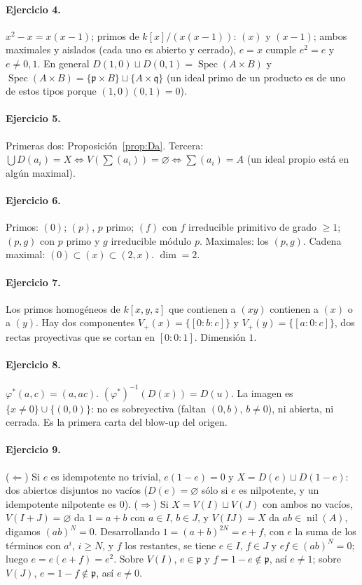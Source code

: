 \documentclass[11pt,a4paper]{article}
\newcommand{\Spec}{\operatorname{Spec}}
\newcommand{\nil}{\operatorname{nil}}
\newcommand{\pp}{\mathfrak{p}}
\newcommand{\qq}{\mathfrak{q}}
\theoremstyle{plain}
\theoremstyle{definition}
\theoremstyle{remark}
\begin{document}
\paragraph{Ejercicio 4.} $x^2-x=x(x-1)$; primos de $k[x]/(x(x-1))$: $(x)$ y $(x-1)$; ambos maximales y aislados (cada uno es abierto y cerrado), $e=x$ cumple $e^2=e$ y $e\ne0,1$. En general $D(1,0)\sqcup D(0,1)=\Spec(A\times B)$ y $\Spec(A\times B)=\{\pp\times B\}\sqcup\{A\times\qq\}$ (un ideal primo de un producto es de uno de estos tipos porque $(1,0)(0,1)=0$).

\paragraph{Ejercicio 5.} Primeras dos: Proposición~\ref{prop:Da}. Tercera: $\bigcup D(a_i)=X\iff V(\sum(a_i))=\varnothing\iff\sum(a_i)=A$ (un ideal propio está en algún maximal).

\paragraph{Ejercicio 6.} Primos: $(0)$; $(p)$, $p$ primo; $(f)$ con $f$ irreducible primitivo de grado $\ge1$; $(p,g)$ con $p$ primo y $g$ irreducible módulo $p$. Maximales: los $(p,g)$. Cadena maximal: $(0)\subset(x)\subset(2,x)$. $\dim=2$.

\paragraph{Ejercicio 7.} Los primos homogéneos de $k[x,y,z]$ que contienen a $(xy)$ contienen a $(x)$ o a $(y)$. Hay dos componentes $V_+(x)=\{[0:b:c]\}$ y $V_+(y)=\{[a:0:c]\}$, dos rectas proyectivas que se cortan en $[0:0:1]$. Dimensión $1$.

\paragraph{Ejercicio 8.} $\varphi^*(a,c)=(a,ac)$. $(\varphi^*)^{-1}(D(x))=D(u)$. La imagen es $\{x\ne0\}\cup\{(0,0)\}$: no es sobreyectiva (faltan $(0,b)$, $b\ne0$), ni abierta, ni cerrada. Es la primera carta del blow-up del origen.

\paragraph{Ejercicio 9.} ($\Leftarrow$) Si $e$ es idempotente no trivial, $e(1-e)=0$ y $X=D(e)\sqcup D(1-e)$: dos abiertos disjuntos no vacíos ($D(e)=\varnothing$ sólo si $e$ es nilpotente, y un idempotente nilpotente es $0$). ($\Rightarrow$) Si $X=V(I)\sqcup V(J)$ con ambos no vacíos, $V(I+J)=\varnothing$ da $1=a+b$ con $a\in I$, $b\in J$, y $V(IJ)=X$ da $ab\in\nil(A)$, digamos $(ab)^N=0$. Desarrollando $1=(a+b)^{2N}=e+f$, con $e$ la suma de los términos con $a^i$, $i\ge N$, y $f$ los restantes, se tiene $e\in I$, $f\in J$ y $ef\in(ab)^N=0$; luego $e=e(e+f)=e^2$. Sobre $V(I)$, $e\in\pp$ y $f=1-e\notin\pp$, así $e\ne1$; sobre $V(J)$, $e=1-f\notin\pp$, así $e\ne0$.
\end{document}
